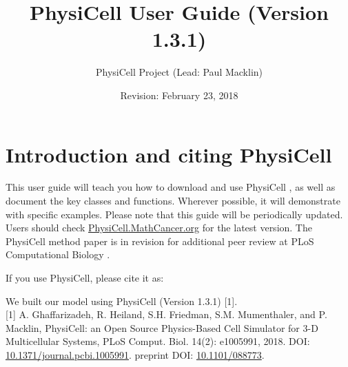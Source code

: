 \documentclass[12pt]{article}
\newcommand{\Version}{1.3.1}
\newcommand{\blue}[1]{\textcolor{blue}{#1}}
\newcommand{\DONE}{}%
\begin{document}
\author{PhysiCell Project (Lead: Paul Macklin)}
\title{PhysiCell User Guide (Version \Version)}
\date{Revision: February 23, 2018}%

\maketitle

\setlength{\parskip}{0in}
\hypertarget{TOC}{}
\tableofcontents
\setlength{\parskip}{8pt}

\section{Introduction and citing PhysiCell \DONE}
This user guide will teach you how to download and use PhysiCell \cite{ref:PhysiCell}, as well as document the key 
classes and functions. Wherever possible, it will demonstrate with specific examples. 
Please note that this guide will be periodically updated.
Users should check \href{http://PhysiCell.MathCancer.org}{PhysiCell.MathCancer.org} for the latest version. 
The PhysiCell method paper is in revision for additional peer review at PLoS Computational Biology \cite{ref:PhysiCell}. 

If you use PhysiCell, please cite it as: 

\hspace{.075\textwidth}\parbox[top]{0.85\textwidth}{%
We built our model using PhysiCell (Version \Version) [1]. \\


[1] A. Ghaffarizadeh, R. Heiland, S.H. Friedman, S.M. Mumenthaler, and P. Macklin, PhysiCell: an Open Source Physics-Based Cell Simulator for 3-D Multicellular Systems, 
PLoS Comput. Biol. 14(2): e1005991, 2018. DOI: \href{https://dx.doi.org/10.1371/journal.pcbi.1005991}{10.1371/journal.pcbi.1005991}. 
% 
preprint DOI: 
\href{http://dx.doi.org/10.1101/088773}{10.1101/088773}. \\
}



\end{document}

